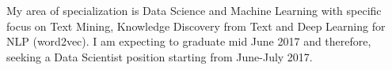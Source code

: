 
My area of specialization is Data Science and Machine Learning with specific focus 
on Text Mining, Knowledge Discovery from Text and Deep Learning for NLP (word2vec).
I am expecting to graduate mid June 2017 and therefore, seeking a Data Scientist position 
starting from June-July 2017. 
